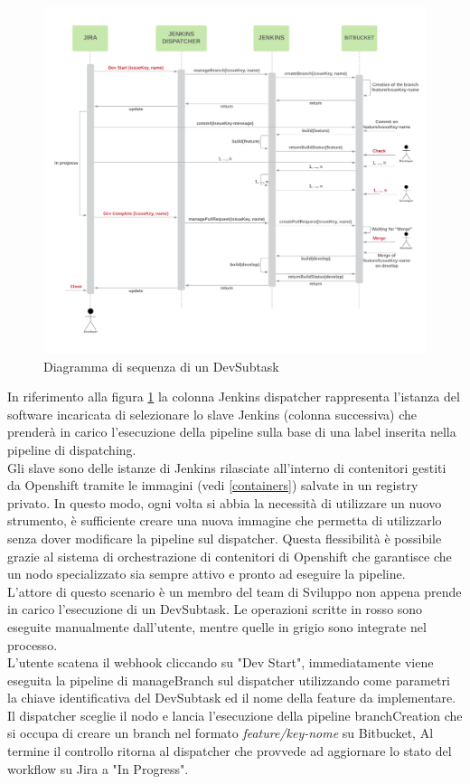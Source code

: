 \documentclass[a4paper, 12pt]{report}
\numberwithin{equation}{section}
\begin{document}
\begin{figure}
    \centering
    \includegraphics[width=\textwidth]{imgs/devsubtask.png}
    \caption{Diagramma di sequenza di un DevSubtask}
    \label{fig:devSub}
\end{figure}
In riferimento alla figura \ref{fig:devSub} la colonna Jenkins dispatcher rappresenta l'istanza del software incaricata di selezionare lo slave Jenkins (colonna successiva) che  prenderà in carico l'esecuzione della pipeline sulla base di una label inserita nella pipeline di dispatching. 
\\Gli slave sono delle istanze di Jenkins rilasciate all'interno di contenitori gestiti da Openshift tramite le immagini (vedi \ref{containers}) salvate in un registry privato. In questo modo, ogni volta si abbia la necessità di utilizzare un nuovo strumento, è sufficiente creare una nuova immagine che permetta di utilizzarlo senza dover modificare la pipeline sul dispatcher. Questa flessibilità è possibile grazie al sistema di orchestrazione di contenitori di Openshift che garantisce che un nodo specializzato sia sempre attivo e pronto ad eseguire la pipeline.
\\
L'attore di questo scenario è un membro del team di Sviluppo non appena prende in carico l'esecuzione di un DevSubtask. Le operazioni scritte in rosso sono eseguite manualmente dall'utente, mentre quelle in grigio sono integrate nel processo. \\
L'utente scatena il webhook cliccando su "Dev Start", immediatamente viene eseguita la pipeline di manageBranch sul dispatcher utilizzando come parametri la chiave identificativa del DevSubtask ed il nome della feature da implementare. Il dispatcher sceglie il nodo e lancia l'esecuzione della pipeline branchCreation che si occupa di creare un branch nel formato \emph{feature/key-nome} su Bitbucket, Al termine il controllo ritorna al dispatcher che provvede ad aggiornare lo stato del workflow su Jira a "In Progress".\\
\end{document}

